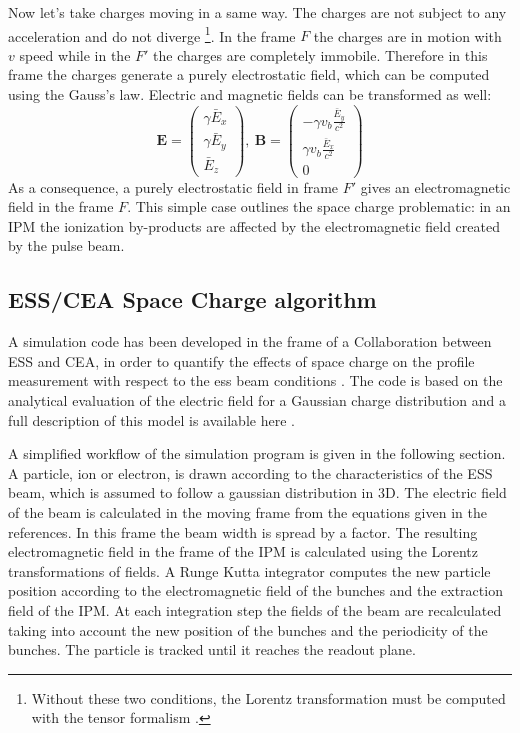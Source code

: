 \begin{refsection}
  Now let's take charges moving in a same way. The charges are not subject to any acceleration and do not diverge \footnote{Without these two conditions, the Lorentz transformation must be computed with the tensor formalism \cite{feynman2011feynman}.}. In the frame $F$ the charges are in motion with $v$ speed while in the $F\prime$ the charges are completely immobile. Therefore in this frame the charges generate a purely electrostatic field, which can be computed using the Gauss's law.
  Electric and magnetic fields can be transformed as well:
  \begin{equation}
    \label{chap3:eqn:Elorentz}
    \boldsymbol{E} =
    \begin{pmatrix}
      \gamma \bar{E}_{x} \\
      \gamma \bar{E}_{y} \\
      \bar{E}_{z}
    \end{pmatrix}
    ,\
    \boldsymbol{B} =
    \begin{pmatrix}
      -\gamma v_{b} \frac{\bar{E}_y}{c^{2}} \\
      \gamma v_{b} \frac{\bar{E}_x}{c^{2}}  \\
      0
    \end{pmatrix}
  \end{equation}
  As a consequence, a purely electrostatic field in frame $F\prime$ gives an electromagnetic field in the frame $F$. This simple case outlines the space charge problematic: in an IPM the ionization by-products are affected by the electromagnetic field created by the pulse beam.


  \subsection{ESS/CEA Space Charge algorithm}
  A simulation code has been developed in the frame of a Collaboration between ESS and CEA, in order to quantify the effects of space charge on the profile measurement with respect to the \acrshort{ess} beam conditions \cite{Thomas-2016-1,Belloni2018}. The code is based on the analytical evaluation of the electric field for a Gaussian charge distribution and a full description of this model is available here \cite[Eq. (16-18)]{Wanzenberg2010}.

  A simplified workflow of the simulation program is given in the following section.
  A particle, ion or electron, is drawn according to the characteristics of the ESS beam, which is assumed to follow a gaussian distribution in 3D. The electric field of the beam is calculated in the moving frame from the equations given in the references. In this frame the beam width is spread by a factor. The resulting electromagnetic field in the frame of the IPM is calculated using the Lorentz transformations of fields. A Runge Kutta integrator computes the new particle position according to the electromagnetic field of the bunches and the extraction field of the IPM. At each integration step the fields of the beam are recalculated taking into account the new position of the bunches and the periodicity of the bunches. The particle is tracked until it reaches the readout plane.


\end{refsection}
